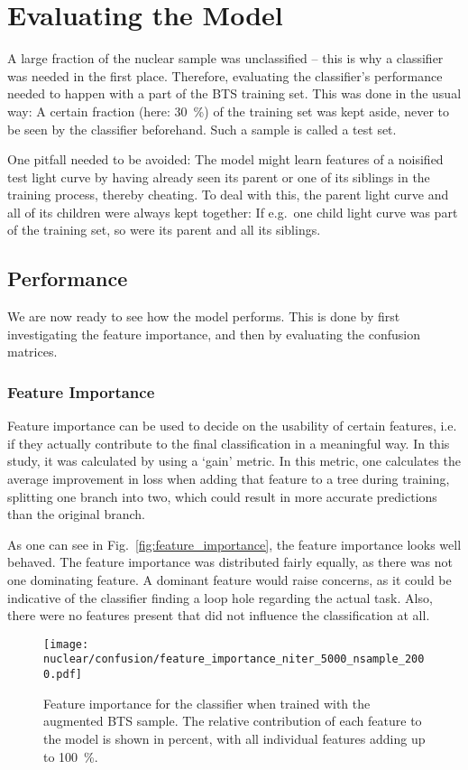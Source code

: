 \section{Evaluating the Model}
A large fraction of the nuclear sample was unclassified -- this is why a classifier was needed in the first place. Therefore, evaluating the classifier's performance needed to happen with a part of the BTS training set. This was done in the usual way: A certain fraction (here: \SI{30}{\percent}) of the training set was kept aside, never to be seen by the classifier beforehand. Such a sample is called a test set.

One pitfall needed to be avoided: The model might learn features of a noisified test light curve by having already seen its parent or one of its siblings in the training process, thereby cheating. To deal with this, the parent light curve and all of its children were always kept together: If e.g.~one child light curve was part of the training set, so were its parent and all its siblings.

\subsection{Performance}
We are now ready to see how the model performs. This is done by first investigating the feature importance, and then by evaluating the confusion matrices.

\subsubsection{Feature Importance}
Feature importance can be used to decide on the usability of certain features, i.e. if they actually contribute to the final classification in a meaningful way. In this study, it was calculated by using a `gain' metric. In this metric, one calculates the average improvement in loss when adding that feature to a tree during training, splitting one branch into two, which could result in more accurate predictions than the original branch.

As one can see in Fig.~\ref{fig:feature_importance}, the feature importance looks well behaved. The feature importance was distributed fairly equally, as there was not one dominating feature. A dominant feature would raise concerns, as it could be indicative of the classifier finding a loop hole regarding the actual task. Also, there were no features present that did not influence the classification at all.

\begin{figure}[htpb]
  \texttt{[image: nuclear/confusion/feature\_importance\_niter\_5000\_nsample\_2000.pdf]}
  \caption[Feature importance]{Feature importance for the classifier when trained with the augmented BTS sample. The relative contribution of each feature to the model is shown in percent, with all individual features adding up to \SI{100}{\percent}.}
\end{figure}

